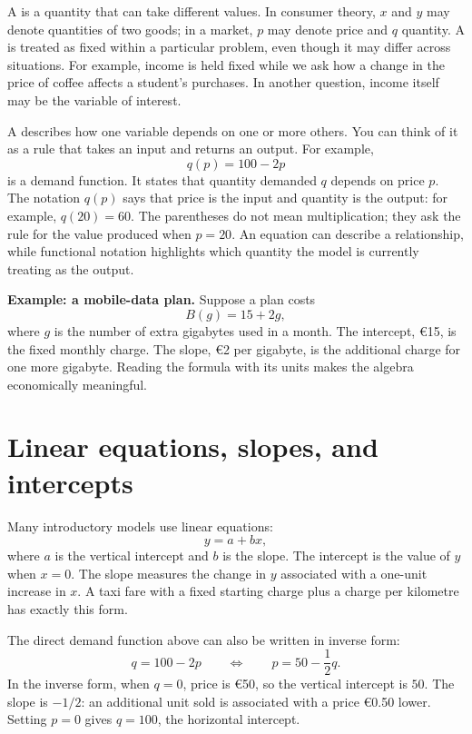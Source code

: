 A  is a quantity that can take different values. In
consumer theory, $x$ and $y$ may denote quantities of two goods; in a market,
$p$ may denote price and $q$ quantity. A  is treated as
fixed within a particular problem, even though it may differ across
situations. For example, income is held fixed while we ask how a change in
the price of coffee affects a student's purchases. In another question,
income itself may be the variable of interest.

A  describes how one variable depends on one or more
others. You can think of it as a rule that takes an input and returns an
output. For example,
\[
q(p)=100-2p
\]
is a demand function. It states that quantity demanded $q$ depends on price
$p$. The notation $q(p)$ says that price is the input and quantity is the
output: for example, $q(20)=60$. The parentheses do not mean multiplication;
they ask the rule for the value produced when $p=20$. An equation can
describe a relationship, while functional notation highlights which quantity
the model is currently treating as the output.

\begin{exercisebox}
\textbf{Example: a mobile-data plan.} Suppose a plan costs
\[
B(g)=15+2g,
\]
where $g$ is the number of extra gigabytes used in a month. The intercept,
\euro15, is the fixed monthly charge. The slope, \euro2 per gigabyte, is the
additional charge for one more gigabyte. Reading the formula with its units
makes the algebra economically meaningful.
\end{exercisebox}

\section{Linear equations, slopes, and intercepts}

Many introductory models use linear equations:
\[
y=a+bx,
\]
where $a$ is the vertical intercept and $b$ is the slope. The intercept is the
value of $y$ when $x=0$. The slope measures the change in $y$ associated with
a one-unit increase in $x$. A taxi fare with a fixed starting charge plus a
charge per kilometre has exactly this form.

The direct demand function above can also be written in inverse form:
\[
q=100-2p
\qquad\Longleftrightarrow\qquad
p=50-\frac{1}{2}q.
\]
In the inverse form, when $q=0$, price is \euro50, so the vertical intercept
is $50$. The slope is $-1/2$: an additional unit sold is associated with a
price \euro0.50 lower. Setting $p=0$ gives $q=100$, the horizontal intercept.

